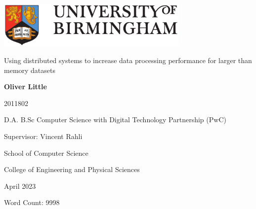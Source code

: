 \begin{titlepage}
	\begin{center}
		\vspace*{1cm}
		
		\includegraphics[width=0.7\textwidth]{uob-logo.eps}
		
		\vspace{1.5cm}
		
		\huge
		Using distributed systems to increase data processing performance for larger than memory datasets
		
		
		
		\vspace{2cm}
		
		\large
		\textbf{Oliver Little}
		
		\vspace{0.25cm}
		
		\small 2011802
		
		\vspace{0.25cm}
		
		\large
		D.A. B.Sc Computer Science with Digital Technology Partnership (PwC)
		
		\vspace{1.5cm}
		
		Supervisor: Vincent Rahli
		
		\vspace{1.5cm}
		
		\large
		School of Computer Science
		
		\large
		College of Engineering and Physical Sciences
		
		\large
		April 2023
		
		\vspace{1.5cm}
		
		\normalsize
		Word Count: 9998
		
	\end{center}
\end{titlepage}